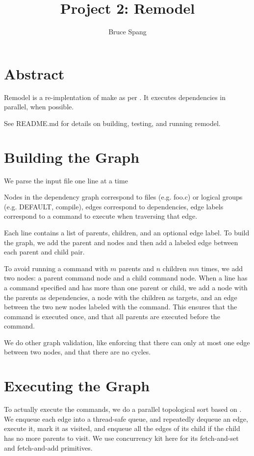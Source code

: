 \documentclass{article}
\begin{document}
\title{Project 2: Remodel}
\author{Bruce Spang}
\maketitle

\section{Abstract}

Remodel is a re-implentation of make \cite{make} as per \cite{assignment}. It executes dependencies in parallel, when possible.

See README.md for details on building, testing, and running remodel.

\section{Building the Graph}

We parse the input file one line at a time

Nodes in the dependency graph correspond to files (e.g. foo.c) or logical groups (e.g. DEFAULT, compile), edges correspond to dependencies, edge labels correspond to a command to execute when traversing that edge.

Each line contains a list of parents, children, and an optional edge label. To build the graph, we add the parent and nodes and then add a labeled edge between each parent and child pair.

To avoid running a command with $m$ parents and $n$ children $mn$ times, we add two nodes: a parent command node and a child command node. When a line has a command specified and has more than one parent or child, we add a node with the parents as dependencies, a node with the children as targets, and an edge between the two new nodes labeled with the command. This ensures that the command is executed once, and that all parents are executed before the command.

We do other graph validation, like enforcing that there can only at most one edge between two nodes, and that there are no cycles.

\section{Executing the Graph}

To actually execute the commands, we do a parallel topological sort based on \cite{topo}. We enqueue each edge into a thread-safe queue, and repeatedly dequeue an edge, execute it, mark it as visited, and enqueue all the edges of its child if the child has no more parents to visit. We use concurrency kit here for its fetch-and-set and fetch-and-add primitives.
\end{document}
